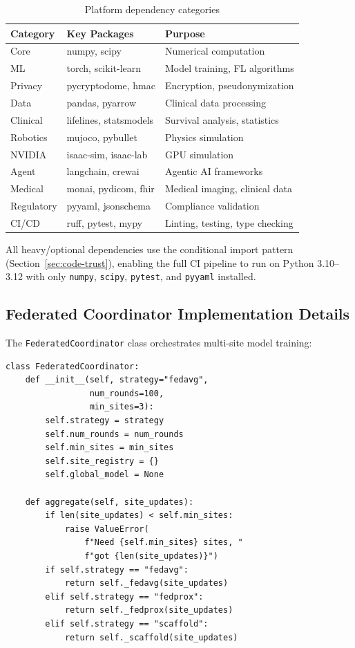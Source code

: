 \begin{table}[H]
\centering
\caption{Platform dependency categories}
\label{tab:dependencies}
\small
\begin{tabular}{@{}lll@{}}
\toprule
\textbf{Category} & \textbf{Key Packages} & \textbf{Purpose} \\
\midrule
Core & numpy, scipy & Numerical computation \\
ML & torch, scikit-learn & Model training, FL algorithms \\
Privacy & pycryptodome, hmac & Encryption, pseudonymization \\
Data & pandas, pyarrow & Clinical data processing \\
Clinical & lifelines, statsmodels & Survival analysis, statistics \\
Robotics & mujoco, pybullet & Physics simulation \\
NVIDIA & isaac-sim, isaac-lab & GPU simulation \\
Agent & langchain, crewai & Agentic AI frameworks \\
Medical & monai, pydicom, fhir & Medical imaging, clinical data \\
Regulatory & pyyaml, jsonschema & Compliance validation \\
CI/CD & ruff, pytest, mypy & Linting, testing, type checking \\
\bottomrule
\end{tabular}
\end{table}

All heavy/optional dependencies use the conditional import pattern (Section~\ref{sec:code-trust}), enabling the full CI pipeline to run on Python 3.10--3.12 with only \texttt{numpy}, \texttt{scipy}, \texttt{pytest}, and \texttt{pyyaml} installed.

\subsection{Federated Coordinator Implementation Details}
\label{sec:fed-coordinator}

The \texttt{FederatedCoordinator} class orchestrates multi-site model training:

\begin{lstlisting}[caption={Federated coordinator aggregation logic}]
class FederatedCoordinator:
    def __init__(self, strategy="fedavg",
                 num_rounds=100,
                 min_sites=3):
        self.strategy = strategy
        self.num_rounds = num_rounds
        self.min_sites = min_sites
        self.site_registry = {}
        self.global_model = None

    def aggregate(self, site_updates):
        if len(site_updates) < self.min_sites:
            raise ValueError(
                f"Need {self.min_sites} sites, "
                f"got {len(site_updates)}")
        if self.strategy == "fedavg":
            return self._fedavg(site_updates)
        elif self.strategy == "fedprox":
            return self._fedprox(site_updates)
        elif self.strategy == "scaffold":
            return self._scaffold(site_updates)
\end{lstlisting}

